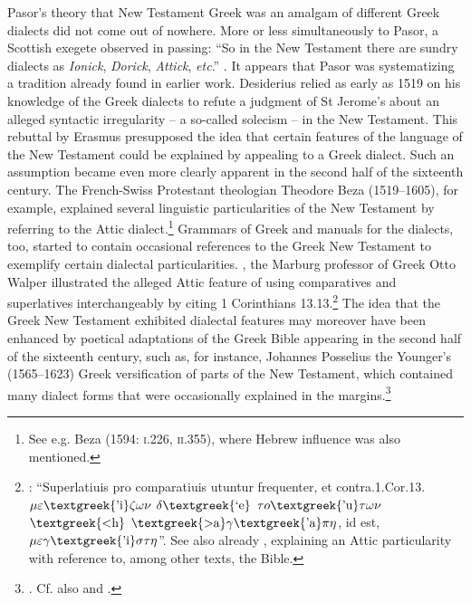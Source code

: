 \documentclass[output=paper]{langsci/langscibook}
\begin{document}
Pasor’s theory that New Testament Greek was an amalgam of different Greek dialects did not come out of nowhere. More or less simultaneously to Pasor, a Scottish exegete observed in passing: “So in the New Testament there are sundry dialects as \textit{Ionick}, \textit{Dorick}, \textit{Attick}, \textit{etc}.” \citep[102]{Weemes1632}. It appears that Pasor was systematizing a tradition already found in earlier work. Desiderius \citet[270]{Erasmus1519} relied as early as 1519 on his knowledge of the Greek dialects to refute a judgment of St Jerome’s about an alleged syntactic irregularity – a so-called solecism – in the New Testament. This rebuttal by Erasmus presupposed the idea that certain features of the language of the New Testament could be explained by appealing to a Greek dialect. Such an assumption became even more clearly apparent in the second half of the sixteenth century. The French-Swiss Protestant theologian Theodore Beza (1519–1605), for example, explained several linguistic particularities of the New Testament by referring to the Attic dialect.\footnote{See e.g. Beza (1594: \textsc{i.}226, \textsc{ii}.355), where Hebrew influence was also mentioned.} Grammars of Greek and manuals for the dialects, too, started to contain occasional references to the Greek New Testament to exemplify certain dialectal particularities. \citealt{In1589}, the Marburg professor of Greek Otto Walper illustrated the alleged Attic feature of using comparatives and superlatives interchangeably by citing 1 Corinthians 13.13.\footnote{\citet[32]{Walper1589}: “Superlatiuis pro comparatiuis utuntur frequenter, et contra.1.Cor.13. $\mu \varepsilon \text{\textgreek{'i}}\zeta \omega \nu $ $\delta \text{\textgreek{`e}}$ $\tau o\text{\textgreek{'u}}\tau \omega \nu $ $\text{\textgreek{<h}}$ $\text{\textgreek{>a}}\gamma \text{\textgreek{'a}}\pi \eta $, id est, $\mu \varepsilon \gamma \text{\textgreek{'i}}\sigma \tau \eta $”. See also already \citet[251]{Ruland1556}, explaining an Attic particularity with reference to, among other texts, the Bible.} The idea that the Greek New Testament exhibited dialectal features may moreover have been enhanced by poetical adaptations of the Greek Bible appearing in the second half of the sixteenth century, such as, for instance, Johannes Posselius the Younger’s (1565–1623) Greek versification of parts of the New Testament, which contained many dialect forms that were occasionally explained in the margins.\footnote{\citet{Posselius1599}. Cf. also \citet{Jamot1593} and \citet{Keimann1649}.}
\end{document}
